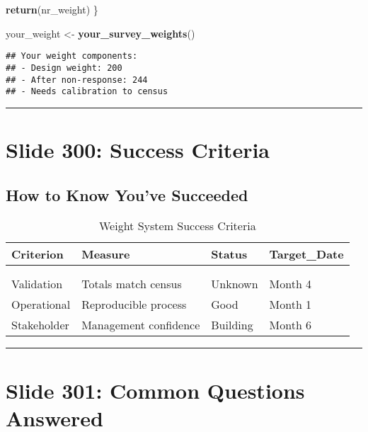 \documentclass[
]{article}
\newenvironment{Shaded}{\begin{snugshade}}{\end{snugshade}}
\newcommand{\FunctionTok}[1]{\textcolor[rgb]{0.13,0.29,0.53}{\textbf{#1}}}
\newcommand{\NormalTok}[1]{#1}
\newcommand{\OtherTok}[1]{\textcolor[rgb]{0.56,0.35,0.01}{#1}}
\begin{document}
\begin{Shaded}
\begin{Highlighting}[]
  \FunctionTok{return}\NormalTok{(nr\_weight)}
\NormalTok{\}}

\NormalTok{your\_weight }\OtherTok{\textless{}{-}} \FunctionTok{your\_survey\_weights}\NormalTok{()}
\end{Highlighting}
\end{Shaded}

\begin{verbatim}
## Your weight components:
## - Design weight: 200 
## - After non-response: 244 
## - Needs calibration to census
\end{verbatim}

\begin{center}\rule{0.5\linewidth}{0.5pt}\end{center}

\section{Slide 300: Success Criteria}\label{slide-300-success-criteria}

\subsection{How to Know You've
Succeeded}\label{how-to-know-youve-succeeded}

\begin{longtable}[t]{llll}
\caption{\label{tab:success-criteria}Weight System Success Criteria}\\
\toprule
Criterion & Measure & Status & Target\_Date\\
\midrule
\cellcolor[HTML]{fff3cd}{Technical} & \cellcolor[HTML]{fff3cd}{CV < 2.0, DEFF < 3} & \cellcolor[HTML]{fff3cd}{Partial} & \cellcolor[HTML]{fff3cd}{Month 3}\\
\cellcolor[HTML]{ffcccc}{Documentation} & \cellcolor[HTML]{ffcccc}{Complete metadata} & \cellcolor[HTML]{ffcccc}{Poor} & \cellcolor[HTML]{ffcccc}{Month 2}\\
Validation & Totals match census & Unknown & Month 4\\
Operational & Reproducible process & Good & Month 1\\
Stakeholder & Management confidence & Building & Month 6\\
\bottomrule
\end{longtable}

\begin{center}\rule{0.5\linewidth}{0.5pt}\end{center}

\section{Slide 301: Common Questions
Answered}\label{slide-301-common-questions-answered}
\end{document}
